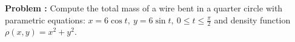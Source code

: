 {\bf Problem :} Compute the total mass of a wire bent in a quarter circle with parametric equations: $x = 6 \cos t, \ y = 6 \sin t, \ 0 \leq t \leq \frac{\pi}{2}$ and density function $\rho(x, y) = x^2 + y^2$. 
